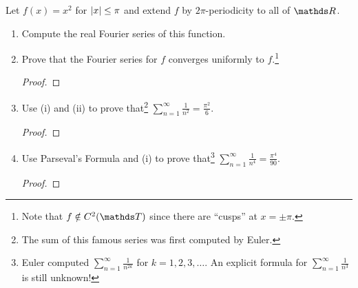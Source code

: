 \documentclass{../homework}
\begin{document}
\begin{Exercise}
  Let \(f(x) = x^2\) for \(\lvert {x} \rvert \leq \pi\) and extend \(f\) by
  \(2\pi\)-periodicity to all of \(\R\).
  \begin{enumerate}
  \item Compute the real Fourier series of this function.

    \begin{solution}

    \end{solution}

  \item Prove that the Fourier series for \(f\) converges uniformly to
    \(f\).\footnote{Note that \(f \notin C^2(\T)\) since there are
      ``cusps'' at \(x = \pm \pi\).}

    \begin{solution}
      \begin{proof}

      \end{proof}
    \end{solution}

  \item Use (i) and (ii) to prove that\footnote{The sum of this famous
      series was first computed by Euler.}
    \(\displaystyle \sum_{n=1}^{\infty} \frac{1}{n^2} =
    \frac{\pi^2}{6}\).

    \begin{solution}
      \begin{proof}

      \end{proof}
    \end{solution}

  \item Use Parseval's Formula and (i) to prove that\footnote{Euler
      computed \(\sum_{n=1}^{\infty} \frac{1}{n^{2k}}\) for
      \(k = 1,2,3,\ldots\).  An explicit formula for
      \(\sum_{n=1}^{\infty} \frac{1}{n^3}\) is still unknown!}
    \(\displaystyle \sum_{n=1}^{\infty} \frac{1}{n^4} =
    \frac{\pi^4}{90}\).

    \begin{solution}
      \begin{proof}

      \end{proof}
    \end{solution}
  \end{enumerate}
\end{Exercise}
\end{document}
